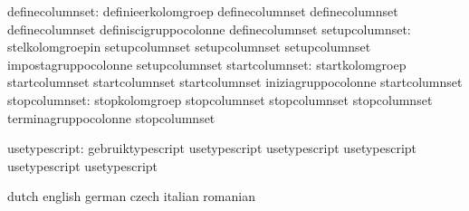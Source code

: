 definecolumnset: definieerkolomgroep        definecolumnset
                 definecolumnset            definecolumnset
                 definiscigruppocolonne     definecolumnset
 setupcolumnset: stelkolomgroepin           setupcolumnset
                 setupcolumnset             setupcolumnset
                 impostagruppocolonne       setupcolumnset
 startcolumnset: startkolomgroep            startcolumnset
                 startcolumnset             startcolumnset
                 iniziagruppocolonne        startcolumnset
  stopcolumnset: stopkolomgroep             stopcolumnset
                 stopcolumnset              stopcolumnset
                 terminagruppocolonne       stopcolumnset

  usetypescript: gebruiktypescript          usetypescript
                 usetypescript              usetypescript
                 usetypescript              usetypescript

\stopcommands




\startcommands                    dutch                            english
                                  german                           czech
                                  italian                          romanian

